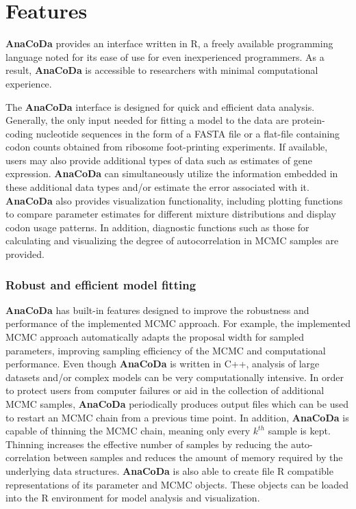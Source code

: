 \documentclass{bioinfo}
\newcommand{\package}{\textbf{AnaCoDa }} %
\begin{document}

\section*{Features}
\package provides an interface written in R, a freely available programming language noted for its ease of use for even inexperienced programmers. 
As a result, \package is accessible to researchers with minimal computational experience. 

The \package interface is designed for quick and efficient data analysis.
Generally, the only input needed for fitting a model to the data are protein-coding nucleotide sequences in the form of a FASTA file or a flat-file containing codon counts obtained from ribosome foot-printing experiments. 
If available, users may also provide additional types of data such as estimates of gene expression.
\package can simultaneously utilize the information embedded in these additional data types and/or estimate the error associated with it.
\package also provides visualization functionality, including plotting functions to compare parameter estimates for different mixture distributions and display codon usage patterns. In addition, diagnostic functions such as those for calculating and visualizing the degree of autocorrelation in MCMC samples are provided.

\subsubsection*{Robust and efficient model fitting}
\package has built-in features designed to improve the robustness and performance of the implemented MCMC approach. 
For example, the implemented MCMC approach automatically adapts the proposal width for sampled parameters, improving sampling efficiency of the MCMC and computational performance.
Even though \package is written in C++, analysis of large datasets and/or complex models can be very computationally intensive.
In order to protect users from computer failures or aid in the collection of additional MCMC samples, \package periodically produces output files which can be used to restart an MCMC chain from a previous time point.
In addition, \package is capable of thinning the MCMC chain, meaning only every $k^{th}$ sample is kept. 
Thinning increases the effective number of samples by reducing the auto-correlation between samples and reduces the amount of memory required by the underlying data structures. 
\package is also able to create file R compatible representations of its parameter and MCMC objects.
These objects can be loaded into the R environment for model analysis and visualization.
\end{document}
